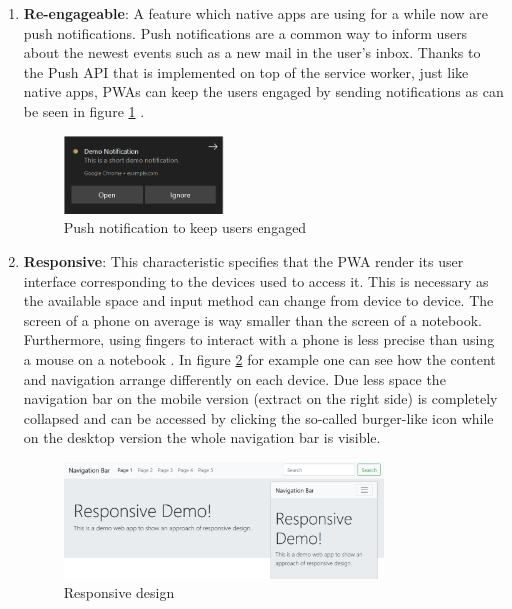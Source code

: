 \begin{enumerate}
	\item \textbf{Re-engageable}: A feature which native apps are using for a while now are push notifications. Push notifications are a common way to inform users about the newest events such as a new mail in the user’s inbox. Thanks to the Push API that is implemented on top of the service worker, just like native apps,  \acs{PWA}s can keep the users engaged by sending notifications as can be seen in figure \ref{fig:pwa_reengageable} \cite[p. 201]{hajianProgressiveWebApps2019}.

\begin{figure}[htbp] 
	\centering
	\includegraphics[width=0.4\textwidth]{Assets/chapter_pwa/demonotification.PNG}
	\caption{Push notification to keep users engaged}
	\label{fig:pwa_reengageable}
\end{figure}

	\item \textbf{Responsive}: This characteristic specifies that the  \acs{PWA} render its user interface corresponding to the devices used to access it. This is necessary as the available space and input method can change from device to device. The screen of a phone on average is way smaller than the screen of a notebook. Furthermore, using fingers to interact with a phone is less precise than using a mouse on a notebook \cite[pp. 115-116]{liebelProgressiveWebApps2019}. In figure \ref{fig:pwa_responsive} for example one can see how the content and navigation arrange differently on each device. Due less space the navigation bar on the mobile version (extract on the right side) is completely collapsed and can be accessed by clicking the so-called burger-like icon while on the desktop version the whole navigation bar is visible.

\begin{figure}[htbp] 
	\centering
	\includegraphics[width=0.8\textwidth]{Assets/chapter_pwa/responsive-overall.jpg}
	\caption{Responsive design}
	\label{fig:pwa_responsive}
\end{figure}


\end{enumerate}
